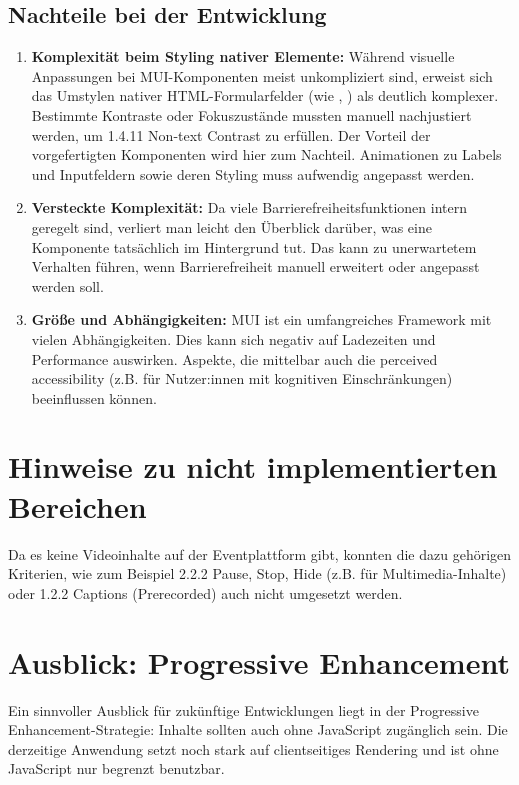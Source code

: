 \subsection{Nachteile bei der Entwicklung}
\begin{enumerate}
    \item \textbf{Komplexität beim Styling nativer Elemente:} Während visuelle Anpassungen bei MUI-Komponenten meist unkompliziert sind, erweist sich das Umstylen nativer HTML-Formularfelder (wie , ) als deutlich komplexer. Bestimmte Kontraste oder Fokuszustände mussten manuell nachjustiert werden, um 1.4.11 Non-text Contrast zu erfüllen. Der Vorteil der vorgefertigten Komponenten wird hier zum Nachteil. Animationen zu Labels und Inputfeldern sowie deren Styling muss aufwendig angepasst werden.

    \item \textbf{Versteckte Komplexität:} Da viele Barrierefreiheitsfunktionen intern geregelt sind, verliert man leicht den Überblick darüber, was eine Komponente tatsächlich im Hintergrund tut. Das kann zu unerwartetem Verhalten führen, wenn Barrierefreiheit manuell erweitert oder angepasst werden soll.

    \item \textbf{Größe und Abhängigkeiten:} MUI ist ein umfangreiches Framework mit vielen Abhängigkeiten. Dies kann sich negativ auf Ladezeiten und Performance auswirken. Aspekte, die mittelbar auch die perceived accessibility (z.B. für Nutzer:innen mit kognitiven Einschränkungen) beeinflussen können.
\end{enumerate}

\section{Hinweise zu nicht implementierten Bereichen}
Da es keine Videoinhalte auf der Eventplattform gibt, konnten die dazu gehörigen Kriterien, wie zum Beispiel 2.2.2 Pause, Stop, Hide (z.B. für Multimedia-Inhalte) oder 1.2.2 Captions (Prerecorded) auch nicht umgesetzt werden. 

\section{Ausblick: Progressive Enhancement}
Ein sinnvoller Ausblick für zukünftige Entwicklungen liegt in der Progressive Enhancement-Strategie: Inhalte sollten auch ohne JavaScript zugänglich sein. Die derzeitige Anwendung setzt noch stark auf clientseitiges Rendering und ist ohne JavaScript nur begrenzt benutzbar.
